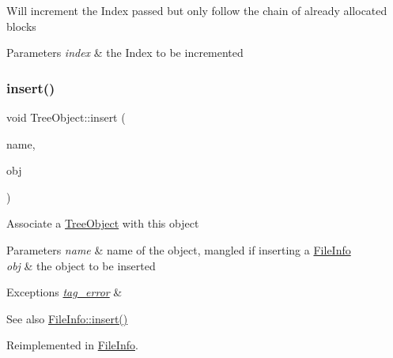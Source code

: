 Will increment the Index passed but only follow the chain of already allocated blocks 
\begin{DoxyParams}{Parameters}
{\em index} & the Index to be incremented \\
\hline
\end{DoxyParams}
\mbox{\label{classTreeObject_af8cc57edba9f435b52ccf33cfbbb2fc6}} 
\subsubsection{\texorpdfstring{insert()}{insert()}}
{\footnotesize\ttfamily void Tree\+Object\+::insert (\begin{DoxyParamCaption}\item[{string}]{name,  }\item[{\mbox{\hyperlink{classTreeObject}{Tree\+Object}} $\ast$}]{obj }\end{DoxyParamCaption})\hspace{0.3cm}{\ttfamily [virtual]}}

Associate a \mbox{\hyperlink{classTreeObject}{Tree\+Object}} with this object 
\begin{DoxyParams}{Parameters}
{\em name} & name of the object, mangled if inserting a \mbox{\hyperlink{classFileInfo}{File\+Info}} \\
\hline
{\em obj} & the object to be inserted \\
\hline
\end{DoxyParams}

\begin{DoxyExceptions}{Exceptions}
{\em \mbox{\hyperlink{classtag__error}{tag\+\_\+error}}} & \\
\hline
\end{DoxyExceptions}
\begin{DoxySeeAlso}{See also}
\mbox{\hyperlink{classFileInfo_ad93a84b63e417b07aa68b619051ab746}{File\+Info\+::insert()}} 
\end{DoxySeeAlso}


Reimplemented in \mbox{\hyperlink{classFileInfo_ad93a84b63e417b07aa68b619051ab746}{File\+Info}}.

\mbox{\label{classTreeObject_a41ce6080e0df5adcea4b0a76d35af885}} 
